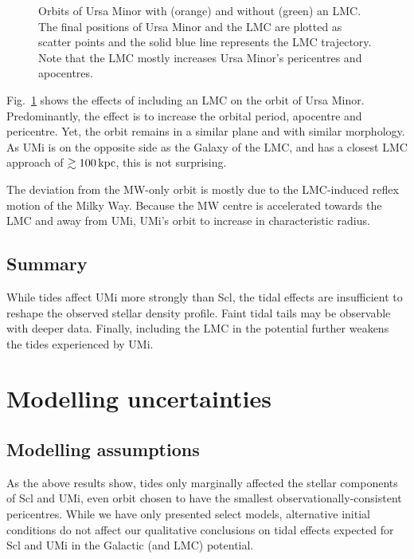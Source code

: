 \begin{figure}
\centering
{}
\caption[Ursa Minor orbits with LMC]{Orbits of Ursa Minor with (orange)
and without (green) an LMC. The final positions of Ursa Minor and the
LMC are plotted as scatter points and the solid blue line represents the
LMC trajectory. Note that the LMC mostly increases Ursa Minor's
pericentres and apocentres.}\label{fig:umi_orbits_lmc}
\end{figure}

Fig.~\ref{fig:umi_orbits_lmc} shows the effects of including an LMC on
the orbit of Ursa Minor. Predominantly, the effect is to increase the
orbital period, apocentre and pericentre. Yet, the orbit remains in a
similar plane and with similar morphology. As UMi is on the opposite
side as the Galaxy of the LMC, and has a closest LMC approach of
\(\gtrsim 100\,{\rm kpc}\), this is not surprising.

The deviation from the MW-only orbit is mostly due to the LMC-induced
reflex motion of the Milky Way. Because the MW centre is accelerated
towards the LMC and away from UMi, UMi's orbit to increase in
characteristic radius.

\subsection{Summary}\label{summary-1}

While tides affect UMi more strongly than Scl, the tidal effects are
insufficient to reshape the observed stellar density profile. Faint
tidal tails may be observable with deeper data. Finally, including the
LMC in the potential further weakens the tides experienced by UMi.

\section{Modelling uncertainties}\label{modelling-uncertainties}

\subsection{Modelling assumptions}\label{modelling-assumptions}

As the above results show, tides only marginally affected the stellar
components of Scl and UMi, even orbit chosen to have the smallest
observationally-consistent pericentres. While we have only presented
select models, alternative initial conditions do not affect our
qualitative conclusions on tidal effects expected for Scl and UMi in the
Galactic (and LMC) potential.

